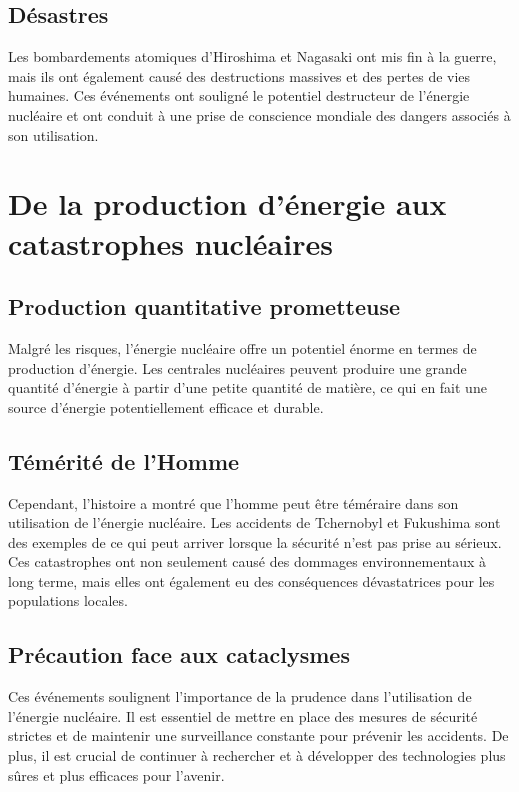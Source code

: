 \subsection{Désastres}

Les bombardements atomiques d'Hiroshima et Nagasaki ont mis fin à la guerre, mais ils ont également causé des destructions massives et des pertes de vies humaines. Ces événements ont souligné le potentiel destructeur de l'énergie nucléaire et ont conduit à une prise de conscience mondiale des dangers associés à son utilisation.

\section{De la production d'énergie aux catastrophes nucléaires}

\subsection{Production quantitative prometteuse}

Malgré les risques, l'énergie nucléaire offre un potentiel énorme en termes de production d'énergie. Les centrales nucléaires peuvent produire une grande quantité d'énergie à partir d'une petite quantité de matière, ce qui en fait une source d'énergie potentiellement efficace et durable.

\subsection{Témérité de l'Homme}

Cependant, l'histoire a montré que l'homme peut être téméraire dans son utilisation de l'énergie nucléaire. Les accidents de Tchernobyl et Fukushima sont des exemples de ce qui peut arriver lorsque la sécurité n'est pas prise au sérieux. Ces catastrophes ont non seulement causé des dommages environnementaux à long terme, mais elles ont également eu des conséquences dévastatrices pour les populations locales.

\subsection{Précaution face aux cataclysmes}

Ces événements soulignent l'importance de la prudence dans l'utilisation de l'énergie nucléaire. Il est essentiel de mettre en place des mesures de sécurité strictes et de maintenir une surveillance constante pour prévenir les accidents. De plus, il est crucial de continuer à rechercher et à développer des technologies plus sûres et plus efficaces pour l'avenir.

